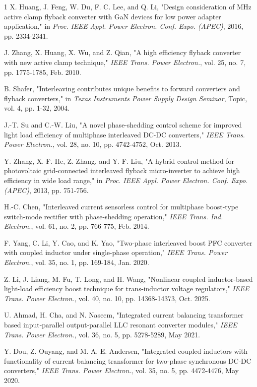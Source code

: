 \documentclass[lettersize,journal]{IEEEtran}
\begin{document}
\begin{thebibliography}{1}
X. Huang, J. Feng, W. Du, F. C. Lee, and Q. Li, "Design consideration of MHz active clamp flyback converter with GaN devices for low power adapter application," in \textit{Proc. IEEE Appl. Power Electron. Conf. Expo. (APEC)}, 2016, pp. 2334-2341.

J. Zhang, X. Huang, X. Wu, and Z. Qian, "A high efficiency flyback converter with new active clamp technique," \textit{IEEE Trans. Power Electron.}, vol. 25, no. 7, pp. 1775-1785, Feb. 2010.

B. Shafer, "Interleaving contributes unique benefits to forward converters and flyback converters," in \textit{Texas Instruments Power Supply Design Seminar}, Topic, vol. 4, pp. 1-32, 2004.

J.-T. Su and C.-W. Liu, "A novel phase-shedding control scheme for improved light load efficiency of multiphase interleaved DC-DC converters," \textit{IEEE Trans. Power Electron.}, vol. 28, no. 10, pp. 4742-4752, Oct. 2013.

Y. Zhang, X.-F. He, Z. Zhang, and Y.-F. Liu, "A hybrid control method for photovoltaic grid-connected interleaved flyback micro-inverter to achieve high efficiency in wide load range," in \textit{Proc. IEEE Appl. Power Electron. Conf. Expo. (APEC)}, 2013, pp. 751-756.

H.-C. Chen, "Interleaved current sensorless control for multiphase boost-type switch-mode rectifier with phase-shedding operation," \textit{IEEE Trans. Ind. Electron.}, vol. 61, no. 2, pp. 766-775, Feb. 2014.

F. Yang, C. Li, Y. Cao, and K. Yao, "Two-phase interleaved boost PFC converter with coupled inductor under single-phase operation," \textit{IEEE Trans. Power Electron.}, vol. 35, no. 1, pp. 169-184, Jan. 2020.

Z. Li, J. Liang, M. Fu, T. Long, and H. Wang, "Nonlinear coupled inductor-based light-load efficiency boost technique for trans-inductor voltage regulators," \textit{IEEE Trans. Power Electron.}, vol. 40, no. 10, pp. 14368-14373, Oct. 2025.

U. Ahmad, H. Cha, and N. Naseem, "Integrated current balancing transformer based input-parallel output-parallel LLC resonant converter modules," \textit{IEEE Trans. Power Electron.}, vol. 36, no. 5, pp. 5278-5289, May 2021.

Y. Dou, Z. Ouyang, and M. A. E. Andersen, "Integrated coupled inductors with functionality of current balancing transformer for two-phase synchronous DC-DC converters," \textit{IEEE Trans. Power Electron.}, vol. 35, no. 5, pp. 4472-4476, May 2020.


\end{thebibliography}
\end{document}
